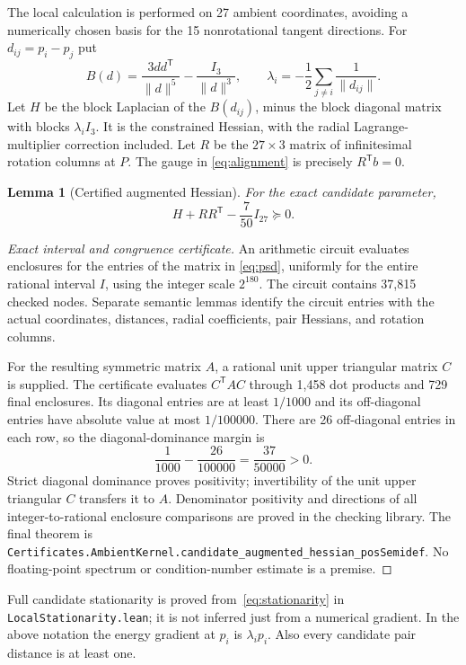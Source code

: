 \documentclass[11pt]{article}
\newtheorem{lemma}[theorem]{Lemma}
\theoremstyle{remark}
\newcommand{\norm}[1]{\lVert #1\rVert}
\newcommand{\code}[1]{{\small\nolinkurl{#1}}}
\newcommand{\pathcode}[1]{\nolinkurl{#1}}
\begin{document}
The local calculation is performed on 27 ambient coordinates, avoiding a
numerically chosen basis for the 15 nonrotational tangent directions. For
$d_{ij}=p_i-p_j$ put
\[
 B(d)=\frac{3dd^{\mathsf T}}{\norm d^5}-\frac{I_3}{\norm d^3},\qquad
 \lambda_i=-\frac12\sum_{j\ne i}\frac1{\norm{d_{ij}}}.
\]
Let $H$ be the block Laplacian of the $B(d_{ij})$, minus the block diagonal
matrix with blocks $\lambda_iI_3$. It is the constrained Hessian, with the
radial Lagrange-multiplier correction included. Let $R$ be the $27\times3$
matrix of infinitesimal rotation columns at $P$. The gauge in
\eqref{eq:alignment} is precisely $R^{\mathsf T}b=0$.

\begin{lemma}[Certified augmented Hessian]\label{lem:hessian}
For the exact candidate parameter,
\begin{equation}\label{eq:psd}
 H+RR^{\mathsf T}-\frac7{50}I_{27}\succeq0.
\end{equation}
\end{lemma}
\begin{proof}[Exact interval and congruence certificate]
An arithmetic circuit evaluates enclosures for the entries of the matrix in
\eqref{eq:psd}, uniformly for the entire rational interval $I$, using the
integer scale $2^{180}$. The circuit contains 37,815 checked nodes. Separate
semantic lemmas identify the circuit entries with the actual coordinates,
distances, radial coefficients, pair Hessians, and rotation columns.

For the resulting symmetric matrix $A$, a rational unit upper triangular
matrix $C$ is supplied. The certificate evaluates $C^{\mathsf T}AC$ through
1,458 dot products and 729 final enclosures. Its diagonal entries are at least
$1/1000$ and its off-diagonal entries have absolute value at most $1/100000$.
There are 26 off-diagonal entries in each row, so the diagonal-dominance
margin is
\[
 \frac1{1000}-\frac{26}{100000}=\frac{37}{50000}>0.
\]
Strict diagonal dominance proves positivity; invertibility of the unit upper
triangular $C$ transfers it to $A$. Denominator positivity and directions of
all integer-to-rational enclosure comparisons are proved in the checking
library. The final theorem is
\code{Certificates.AmbientKernel.candidate_augmented_hessian_posSemidef}.
No floating-point spectrum or condition-number estimate is a premise.
\end{proof}

Full candidate stationarity is proved from~\eqref{eq:stationarity} in
\pathcode{LocalStationarity.lean}; it is not inferred just from a numerical
gradient. In the above notation the energy gradient at $p_i$ is
$\lambda_ip_i$. Also every candidate pair distance is at least one.
\end{document}
